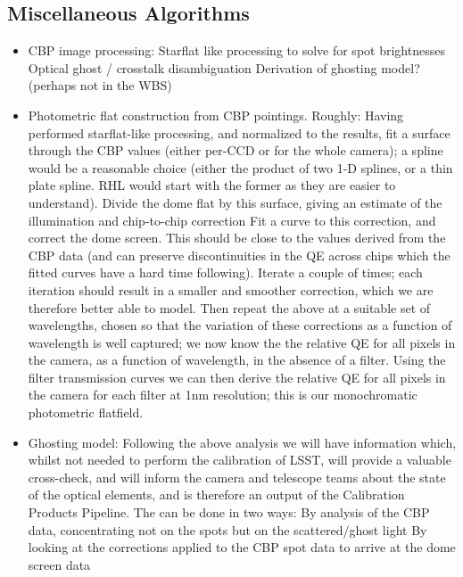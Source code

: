 \subsection{Miscellaneous Algorithms}\label{sec:CPP:miscAlg}
\begin{itemize}
	\item CBP image processing:
		\mysubitem Starflat like processing to solve for spot brightnesses
		\mysubitem Optical ghost / crosstalk disambiguation
		\mysubitem Derivation of ghosting model? (perhaps not in the WBS)
	\item Photometric flat construction from CBP pointings. Roughly:
		  \mysubitem Having performed starflat-like processing, and normalized to the results, fit a surface through the CBP values (either per-CCD or for the whole camera); a spline would be a reasonable choice (either the product of two 1-D splines, or a thin plate spline. RHL would start with the former as they are easier to understand).
		  \mysubitem Divide the dome flat by this surface, giving an estimate of the illumination and chip-to-chip correction
		  \mysubitem Fit a curve to this correction, and correct the dome screen.  This should be close to the values derived from the CBP data (and can preserve discontinuities in the QE across chips which the fitted curves have a hard time following).
		  \mysubitem Iterate a couple of times; each iteration should result in a smaller and smoother correction, which we are therefore better able to model.
		  \mysubitem Then repeat the above at a suitable set of wavelengths, chosen so that the variation of these corrections as a function of wavelength is well captured; we now know the the relative QE for all pixels in the camera, as a function of wavelength, in the absence of a filter.
		  \mysubitem Using the filter transmission curves we can then derive the relative QE for all pixels in the camera for each filter at 1nm resolution; this is our monochromatic photometric flatfield.
	 \item Ghosting model: Following the above analysis we will have information which, whilst not needed to perform the calibration of LSST, will provide a valuable cross-check, and will inform the camera and telescope teams about the state of the optical elements, and is therefore an output of the Calibration Products Pipeline. The can be done in two ways:
		  \mysubitem By analysis of the CBP data, concentrating not on the spots but on the scattered/ghost light
		  \mysubitem By looking at the corrections applied to the CBP spot data to arrive at the dome screen data

	
\end{itemize}


